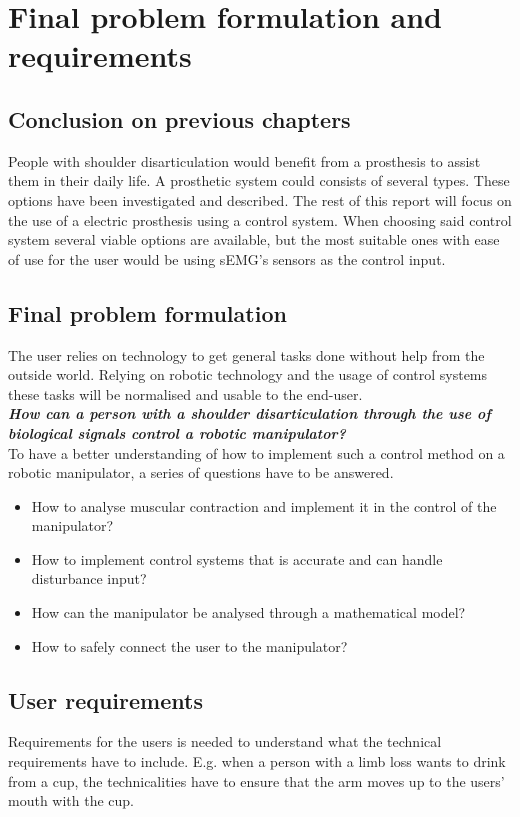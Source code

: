 \chapter{Final problem formulation and requirements}\label{ch:FinalProb}
\section{Conclusion on previous chapters}
People with shoulder disarticulation would benefit from a prosthesis to assist them in their daily life. A prosthetic system could consists of several types. These options have been investigated and described. The rest of this report will focus on the use of a electric prosthesis using a control system. When choosing said control system several viable options are available, but the most suitable ones with ease of use for the user would be using sEMG's sensors as the control input.\\
\section{Final problem formulation}
The user relies on technology to get general tasks done without help from the outside world.
Relying on robotic technology and the usage of control systems these tasks will be normalised and usable to the end-user.\\
\noindent
\textbf{\textit{\centering How can a person with a shoulder disarticulation through the use of biological signals control a robotic manipulator?}}\\

To have a better understanding of how to implement such a control method on a robotic manipulator, a series of questions have to be answered. 
\begin{itemize}
    \item How to analyse muscular contraction and implement it in the control of the manipulator?
    \item How to implement control systems that is accurate and can handle disturbance input?
    \item How can the manipulator be analysed through a mathematical model?
    \item How to safely connect the user to the manipulator?
\end{itemize}


\section{User requirements}\label{Requirements}
Requirements for the users is needed to understand what the technical requirements have to include. E.g. when a person with a limb loss wants to drink from a cup, the technicalities have to ensure that the arm moves up to the users' mouth with the cup.\\


